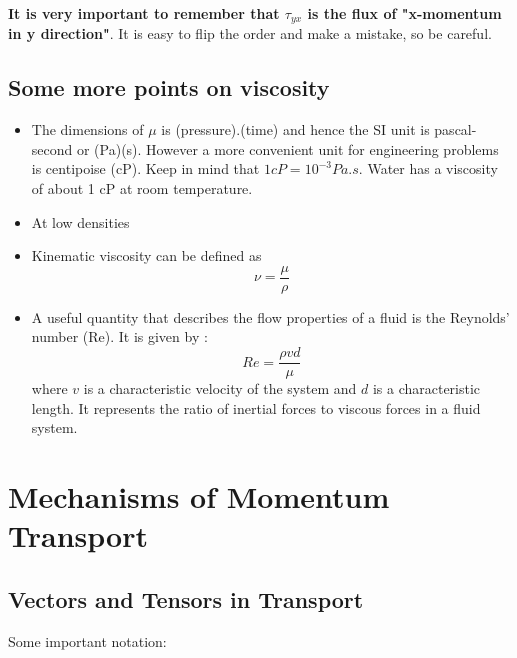 \textbf{It is very important to remember that $\tau_{yx}$ is the flux of "x-momentum in y direction"}. It is easy to flip the order and make a mistake, so be careful.

\subsection*{Some more points on viscosity}

\begin{itemize}
    \item The dimensions of $\mu$ is (pressure).(time) and hence the SI unit is pascal-second or (Pa)(s). However a more convenient unit for engineering problems is centipoise (cP). Keep in mind that $1 cP = 10^{-3} Pa.s$. Water has a viscosity of about 1 cP at room temperature.

    \item At low densities 

    \item Kinematic viscosity can be defined as $$\nu = \frac{\mu}{\rho}$$

    \item A useful quantity that describes the flow properties of a fluid is the Reynolds' number (Re). It is given by : $$Re = \frac{\rho v d}{\mu}$$ where $v$ is a characteristic velocity of the system and $d$ is a characteristic length. It represents the ratio of inertial forces to viscous forces in a fluid system.
\end{itemize}

\section{Mechanisms of Momentum Transport}

\subsection{Vectors and Tensors in Transport}

Some important notation:


